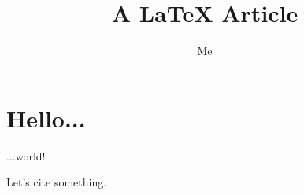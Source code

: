 \documentclass[a4paper,12pt]{article}
\title{A LaTeX Article}
\author{Me}
\begin{document}
\maketitle

\section{Hello...}

...world!


Let's cite something\cite{FRENOT:2010:INRIA-00436041:1}.



\end{document}
